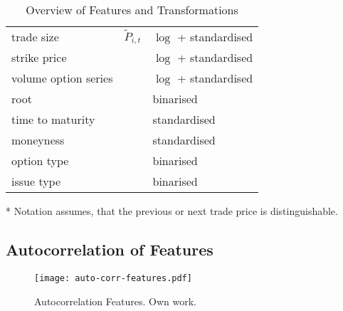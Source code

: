 \begin{table}[H]
\begin{threeparttable}
\begin{tabular}{@{}lll@{}}
            trade size              & $\tilde{P}_{i, t}$                                                                               & $\log$ + standardised           \\
            strike price            &                                                                                                  & $\log$ + standardised           \\
            volume option series    &                                                                                                  & $\log$ + standardised           \\
            root                    &                                                                                                  & binarised          \\
            time to maturity        &                                                                                                  &  standardised         \\
            moneyness               &                                                                                                  &  standardised         \\
            option type             &                                                                                                  &  binarised         \\
            issue type              &                                                                                                  &  binarised         \\ \bottomrule
        \end{tabular}
        \begin{tablenotes}\footnotesize
            \item[*] Notation assumes, that the previous or next trade price is distinguishable.
        \end{tablenotes}
    \end{threeparttable}
    \caption[Overview of Features and Transformations]{Overview of Features and Transformations}
    \label{tab:features-transformations}
\end{table}

\newpage
\subsection{Autocorrelation of Features}
\label{app:autocorrelation-of-features}

\begin{figure}[ht]
    \centering
    \texttt{[image: auto-corr-features.pdf]}
    \caption[Autocorrelation of Features]{Autocorrelation Features. Own work.}
    \label{fig:auto-correlation-features}
\end{figure}

